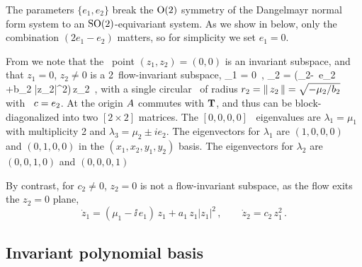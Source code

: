 \documentclass[aip,cha,
reprint,
secnumarabic,
nofootinbib, tightenlines,
nobibnotes, showkeys, showpacs,
groupedaddress,
]{revtex4-1}
\begin{document}
The parameters $\{e_1,e_2\}$ break the $\textrm{O}(2)$ symmetry of the
Dangelmayr normal form system to an $\textrm{SO}(2)$-equivariant
system. As we show in  below, only the combination
$(2e_1-e_2)$ matters, so for simplicity we set $e_1=0$.

From  we note that the \eqv\ point \((z_1,z_2)=(0,0)\)
is an invariant subspace, and that $z_1=0$, $z_2 \neq 0$ is a 2\dmn\
flow-invariant subspace,
\beq
  _1 = 0
\,,\qquad
  _2 = (\mu_2-\ii\, e_2 +b_2 |z_2|^2)\,{z_2}
\,,
with a single circular \reqv\ of radius $r_2 = \norm{z_2} = \sqrt{-\mu_2/b_2}$ with
\phaseVel\ $\velRel=e_2$.
At the origin $\Mvar$ commutes with $\Lg$, and thus can be block-diagonalized
into two $[2\!\times\!2]$ matrices.
The $[0,0,0,0]$ \eqv\ eigenvalues are $\lambda_1 = \mu_1$ with multiplicity 2 and
             $\lambda_3 = \mu_2 \pm i e_2$. The eigenvectors for
             $\lambda_1$ are $(1,0,0,0)$ and $(0,1,0,0)$ in the
             $(x_1,x_2,y_1,y_2)$ basis.
             The eigenvectors for
             $\lambda_2$ are $(0,0,1,0)$ and $(0,0,0,1)$



By contrast, for $c_2 \neq 0$, $z_2 =0$ is not a flow-invariant subspace,
as the flow exits the $z_2 =0$ plane,
\[
  \dot{z}_1 = (\mu_1-\ii\, e_1)\,z_1+a_1\,z_1|z_1|^2
\,,\qquad
  \dot{z}_2 = c_2\,z_1^2
\,.
\]




\subsection{Invariant polynomial basis}
\label{s:invPol}
\end{document}
